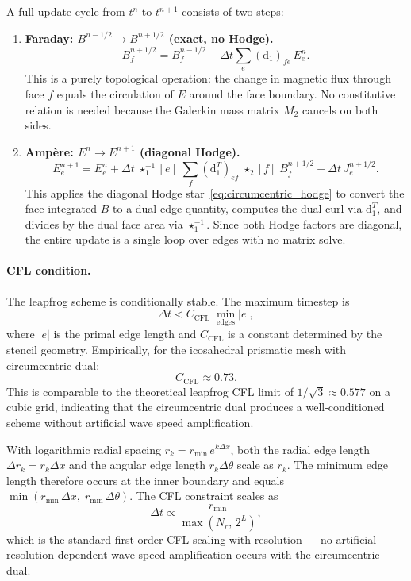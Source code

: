 \documentclass[11pt,a4paper]{article}
\newcommand{\dd}{\mathrm{d}}
\newcommand{\hodge}{\star}
\begin{document}
A full update cycle from $t^n$ to $t^{n+1}$ consists of two steps:
\begin{enumerate}
  \item \textbf{Faraday: $B^{n-1/2} \to B^{n+1/2}$ (exact, no Hodge).}
    \begin{equation}
      B_f^{n+1/2} = B_f^{n-1/2}
        - \Delta t \sum_e (\dd_1)_{fe}\,E_e^n.
    \end{equation}
    This is a purely topological operation: the change in magnetic flux
    through face $f$ equals the circulation of $E$ around the face boundary.
    No constitutive relation is needed because the Galerkin mass matrix
    $M_2$ cancels on both sides.

  \item \textbf{Amp\`ere: $E^n \to E^{n+1}$ (diagonal Hodge).}
    \begin{equation}
      E_e^{n+1} = E_e^n + \Delta t\;\hodge_1^{-1}[e]\;\sum_f
        (\dd_1^T)_{ef}\;\hodge_2[f]\;B_f^{n+1/2}
        - \Delta t\,J_e^{n+1/2}.
    \end{equation}
    This applies the diagonal Hodge star~\eqref{eq:circumcentric_hodge}
    to convert the face-integrated $B$ to a dual-edge quantity, computes
    the dual curl via $\dd_1^T$, and divides by the dual face area via
    $\hodge_1^{-1}$. Since both Hodge factors are diagonal, the entire
    update is a single loop over edges with no matrix solve.
\end{enumerate}

\paragraph{CFL condition.}
The leapfrog scheme is conditionally stable. The maximum timestep is
\begin{equation}
  \Delta t < C_\text{CFL}\;\min_{\text{edges}} |e|,
  \label{eq:cfl}
\end{equation}
where $|e|$ is the primal edge length and $C_\text{CFL}$ is a constant
determined by the stencil geometry. Empirically, for the icosahedral prismatic
mesh with circumcentric dual:
\begin{equation}
  C_\text{CFL} \approx 0.73.
  \label{eq:cfl_number}
\end{equation}
This is comparable to the theoretical leapfrog CFL limit of $1/\sqrt{3}
\approx 0.577$ on a cubic grid, indicating that the circumcentric dual
produces a well-conditioned scheme without artificial wave speed amplification.

With logarithmic radial spacing $r_k = r_\text{min}\,e^{k\Delta x}$, both the
radial edge length $\Delta r_k = r_k \Delta x$ and the angular edge length
$r_k \Delta\theta$ scale as $r_k$. The minimum edge length therefore occurs at
the inner boundary and equals $\min(r_\text{min}\,\Delta x,\;
r_\text{min}\,\Delta\theta)$. The CFL constraint scales as
\begin{equation}
  \Delta t \propto \frac{r_\text{min}}{\max(N_r,\,2^L)},
\end{equation}
which is the standard first-order CFL scaling with resolution --- no artificial
resolution-dependent wave speed amplification occurs with the circumcentric
dual.
\end{document}
